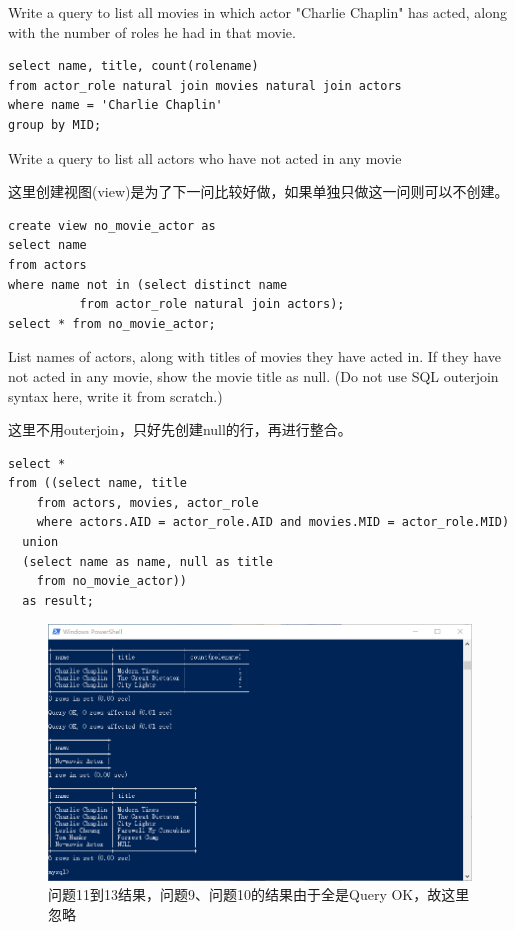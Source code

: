 \documentclass[logo,reportComp]{thesis}
\begin{document}
\begin{question}
\normalfont 
Write a query to list all movies in which actor "Charlie Chaplin" has acted, along with the number of roles he had in that movie.
\end{question}
\begin{answer}\mbox{}\par
\begin{lstlisting}
select name, title, count(rolename)
from actor_role natural join movies natural join actors
where name = 'Charlie Chaplin'
group by MID;
\end{lstlisting}
\end{answer}

\begin{question}
\normalfont 
Write a query to list all actors who have not acted in any movie
\end{question}
\begin{answer}这里创建视图(view)是为了下一问比较好做，如果单独只做这一问则可以不创建。
\begin{lstlisting}
create view no_movie_actor as
select name
from actors
where name not in (select distinct name
          from actor_role natural join actors);
select * from no_movie_actor;
\end{lstlisting}
\end{answer}

\begin{question}
\normalfont 
List names of actors, along with titles of movies they have acted in. If they have not acted in any movie, show the movie title as null. (Do not use SQL outerjoin syntax here, write it from scratch.)
\end{question}
\begin{answer}这里不用outerjoin，只好先创建null的行，再进行整合。
\begin{lstlisting}
select *
from ((select name, title
    from actors, movies, actor_role
    where actors.AID = actor_role.AID and movies.MID = actor_role.MID)
  union
  (select name as name, null as title
    from no_movie_actor))
  as result;
\end{lstlisting}
\end{answer}

\begin{figure}[H]
\centering
\includegraphics[width=\linewidth]{fig/Q9-13.png}
\caption{问题11到13结果，问题9、问题10的结果由于全是Query OK，故这里忽略}
\end{figure}
\end{document}

